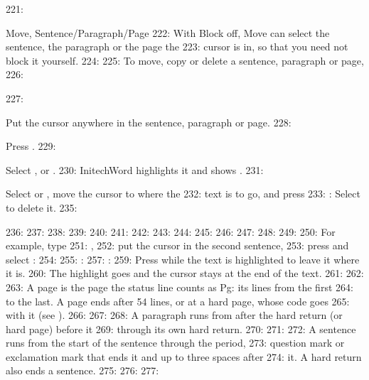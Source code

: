221: \begin{Feature}{Move, Sentence/Paragraph/Page}
222: With Block off, Move can select the sentence, the paragraph or the page the
223: cursor is in, so that you need not block it yourself.
224: 
225: To move, copy or delete a sentence, paragraph or page,
226: \begin{WPSteps}
227: \item Put the cursor anywhere in the sentence, paragraph or page.
228: \item Press .
229: \item Select ,  or .
230: InitechWord highlights it and shows .
231: \item Select  or , move the cursor to where the
232: text is to go, and press 
233: : Select  to delete it.
235: \end{WPSteps}
236: 
237: 
238: 
239: 
240: 
241: 
242: 
243: 
244: 
245: 
246: 
247: 
248: 
249: 
250: For example, type
251: ,
252: put the cursor in the second sentence,
253: press  and select :
254: 
255: : 
257: : 
259: Press  while the text is highlighted to leave it where it is.
260: The highlight goes and the cursor stays at the end of the text.
261: 
262: 
263: A page is the page the status line counts as Pg: its lines from the first
264: to the last.  A page ends after 54 lines, or at a hard page, whose code goes
265: with it (see ).
266: 
267: 
268: A paragraph runs from after the hard return (or hard page) before it
269: through its own hard return.
270: 
271: 
272: A sentence runs from the start of the sentence through the period,
273: question mark or exclamation mark that ends it and up to three spaces after
274: it.  A hard return also ends a sentence.
275: 
276: 
277: \end{Feature}
